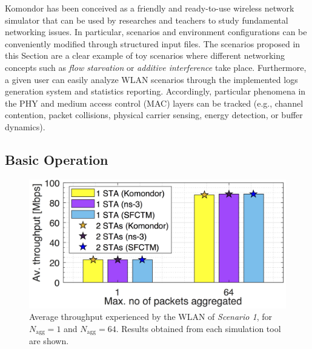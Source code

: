 \documentclass[conference]{IEEEtran}
\begin{document}
	Komondor has been conceived as a friendly and ready-to-use wireless network simulator that can be used by researches and teachers to study fundamental networking issues. In particular, scenarios and environment configurations can be conveniently modified through structured input files. The scenarios proposed in this Section are a clear example of toy scenarios where different networking concepts such as \textit{flow starvation} or \textit{additive interference} take place. Furthermore, a given user can easily analyze WLAN scenarios through the implemented logs generation system and statistics reporting. Accordingly, particular phenomena in the PHY and medium access control (MAC) layers can be tracked (e.g., channel contention, packet collisions, physical carrier sensing, energy detection, or buffer dynamics). %
	
	\subsection{Basic Operation}
	\label{section:simple_scenarios}
	
	\begin{figure}[t]
		\centering		
		\includegraphics[width=0.8\columnwidth]{results_scenario_1.png}
		\caption{Average throughput experienced by the WLAN of \textit{Scenario 1}, for $N_{\text{agg}} = 1$ and $N_{\text{agg}} = 64$. Results obtained from each simulation tool are shown.}
		\label{fig:results_simple_scenarios}
	\end{figure}
	
\end{document}
